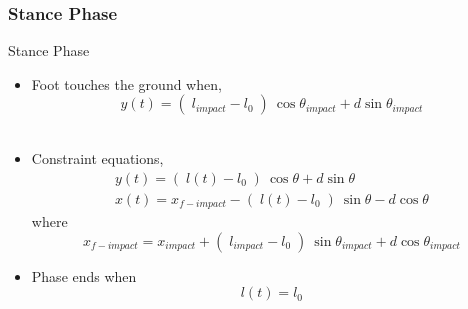 \begin{frame}
\frametitle{Stance Phase}
\begin{block}{Stance Phase}
\begin{itemize}
 \item
  Foot touches the ground when,
  \begin{equation*}
  y(t) = (\;l_{impact} - l_0\;)\:\cos \theta_{impact} + d \sin \theta_{impact}
  \end{equation*}\\[0.1in]
  \item
  Constraint equations,
  \begin{eqnarray*}
    y(t) = (\;l(t) - l_0\;)\:\cos \theta + d \sin \theta\\
    x(t) = x_{f-impact} - (\;l(t) - l_0\;)\:\sin \theta - d \cos \theta
  \end{eqnarray*}
  where
  \begin{equation*}
  x_{f-impact} =  x_{impact} + (\;l_{impact} - l_0\;)\:\sin \theta_{impact} + d \cos \theta_{impact}
  \end{equation*}
  \item
  Phase ends when
  \begin{equation*}
  l(t) = l_0 
  \end{equation*}

  \end{itemize}

\end{block}

\end{frame}



